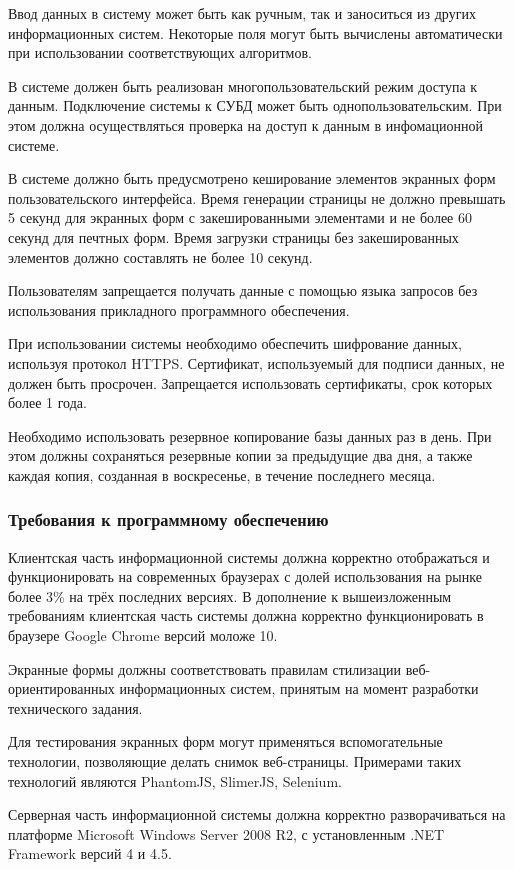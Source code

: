 Ввод данных в систему может быть как ручным, так и заноситься из других информационных систем.
Некоторые поля могут быть вычислены автоматически при использовании соответствующих алгоритмов.

В системе должен быть реализован многопользовательский режим доступа к данным.
Подключение системы к СУБД может быть однопользовательским.
При этом должна осуществляться проверка на доступ к данным в инфомационной системе.

В системе должно быть предусмотрено кеширование элементов экранных форм пользовательского интерфейса.
Время генерации страницы не должно превышать 5 секунд для экранных форм с закешированными элементами и не более 60 секунд для печтных форм.
Время загрузки страницы без закешированных элементов должно составлять не более 10 секунд.

Пользователям запрещается получать данные с помощью языка запросов без использования прикладного программного обеспечения.

При использовании системы необходимо обеспечить шифрование данных, используя протокол HTTPS.
Сертификат, используемый для подписи данных, не должен быть просрочен.
Запрещается использовать сертификаты, срок которых более 1 года.

Необходимо использовать резервное копирование базы данных раз в день.
При этом должны сохраняться резервные копии за предыдущие два дня, а также каждая копия, созданная в воскресенье, в течение последнего месяца.

\subsubsection{Требования к программному обеспечению}

Клиентская часть информационной системы должна корректно отображаться и функционировать на современных браузерах с долей использования на рынке более 3\% на трёх последних версиях.
В дополнение к вышеизложенным требованиям клиентская часть системы должна корректно функционировать в браузере Google Chrome версий моложе 10.

Экранные формы должны соответствовать правилам стилизации веб-ориентированных информационных систем, принятым на момент разработки технического задания.

Для тестирования экранных форм могут применяться вспомогательные технологии, позволяющие делать снимок веб-страницы.
Примерами таких технологий являются PhantomJS, SlimerJS, Selenium.

Серверная часть информационной системы должна корректно разворачиваться на платформе Microsoft Windows Server 2008 R2,  с установленным .NET Framework версий 4 и 4.5.

